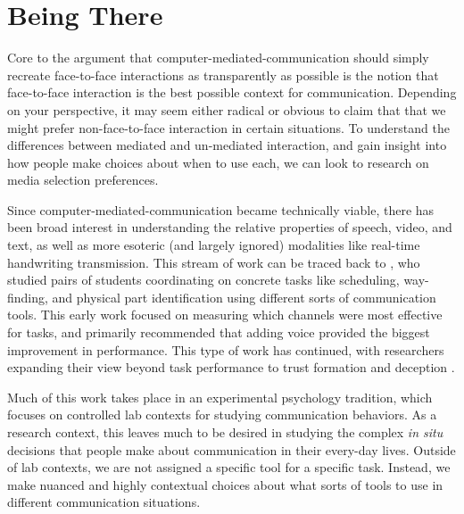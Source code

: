 
\section{Being There}
Core to the argument that computer-mediated-communication should simply recreate face-to-face interactions as transparently as possible is the notion that face-to-face interaction is the best possible context for communication. Depending on your perspective, it may seem either radical or obvious to claim that that we might prefer non-face-to-face interaction in certain situations. To understand the differences between mediated and un-mediated interaction, and gain insight into how people make choices about when to use each, we can look to research on media selection preferences.

Since computer-mediated-communication became technically viable, there has been broad interest in understanding the relative properties of speech, video, and text, as well as more esoteric (and largely ignored) modalities like real-time handwriting transmission. \citep{Williams:1977p682} This stream of work can be traced back to \citet{Ochsman:1974vu}, who studied pairs of students coordinating on concrete tasks like scheduling, way-finding, and physical part identification using different sorts of communication tools. This early work focused on measuring which channels were most effective for tasks, and primarily recommended that adding voice provided the biggest improvement in performance. This type of work has continued, with researchers expanding their view beyond task performance to trust formation \citep{Bos:2002p256}\citep{Toma:2010p347} and deception \citep{Hancock:2004p314}.


Much of this work takes place in an experimental psychology tradition, which focuses on controlled lab contexts for studying communication behaviors. As a research context, this leaves much to be desired in studying the complex \emph{in situ} decisions that people make about communication in their every-day lives. Outside of lab contexts, we are not assigned a specific tool for a specific task. Instead, we make nuanced and highly contextual choices about what sorts of tools to use in different communication situations. 


